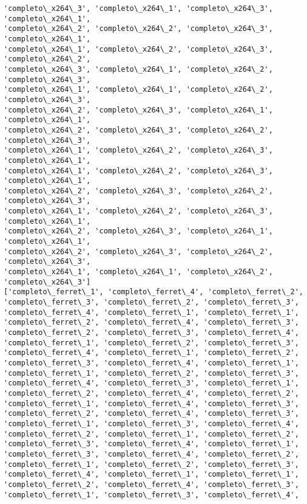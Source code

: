 \documentclass[11pt]{article}
\begin{document}
\begin{Verbatim}[commandchars=\\\{\}]
'completo\_x264\_3', 'completo\_x264\_1', 'completo\_x264\_3', 'completo\_x264\_1',
'completo\_x264\_2', 'completo\_x264\_2', 'completo\_x264\_3', 'completo\_x264\_1',
'completo\_x264\_1', 'completo\_x264\_2', 'completo\_x264\_3', 'completo\_x264\_2',
'completo\_x264\_3', 'completo\_x264\_1', 'completo\_x264\_2', 'completo\_x264\_3',
'completo\_x264\_1', 'completo\_x264\_1', 'completo\_x264\_2', 'completo\_x264\_3',
'completo\_x264\_2', 'completo\_x264\_3', 'completo\_x264\_1', 'completo\_x264\_1',
'completo\_x264\_2', 'completo\_x264\_3', 'completo\_x264\_2', 'completo\_x264\_3',
'completo\_x264\_1', 'completo\_x264\_2', 'completo\_x264\_3', 'completo\_x264\_1',
'completo\_x264\_1', 'completo\_x264\_2', 'completo\_x264\_3', 'completo\_x264\_1',
'completo\_x264\_2', 'completo\_x264\_3', 'completo\_x264\_2', 'completo\_x264\_3',
'completo\_x264\_1', 'completo\_x264\_2', 'completo\_x264\_3', 'completo\_x264\_1',
'completo\_x264\_2', 'completo\_x264\_3', 'completo\_x264\_1', 'completo\_x264\_1',
'completo\_x264\_2', 'completo\_x264\_3', 'completo\_x264\_2', 'completo\_x264\_3',
'completo\_x264\_1', 'completo\_x264\_1', 'completo\_x264\_2', 'completo\_x264\_3']
['completo\_ferret\_1', 'completo\_ferret\_4', 'completo\_ferret\_2',
'completo\_ferret\_3', 'completo\_ferret\_2', 'completo\_ferret\_3',
'completo\_ferret\_4', 'completo\_ferret\_1', 'completo\_ferret\_1',
'completo\_ferret\_2', 'completo\_ferret\_4', 'completo\_ferret\_3',
'completo\_ferret\_2', 'completo\_ferret\_3', 'completo\_ferret\_4',
'completo\_ferret\_1', 'completo\_ferret\_2', 'completo\_ferret\_3',
'completo\_ferret\_4', 'completo\_ferret\_1', 'completo\_ferret\_2',
'completo\_ferret\_3', 'completo\_ferret\_4', 'completo\_ferret\_1',
'completo\_ferret\_1', 'completo\_ferret\_2', 'completo\_ferret\_3',
'completo\_ferret\_4', 'completo\_ferret\_3', 'completo\_ferret\_1',
'completo\_ferret\_2', 'completo\_ferret\_4', 'completo\_ferret\_2',
'completo\_ferret\_1', 'completo\_ferret\_4', 'completo\_ferret\_3',
'completo\_ferret\_2', 'completo\_ferret\_4', 'completo\_ferret\_3',
'completo\_ferret\_1', 'completo\_ferret\_3', 'completo\_ferret\_4',
'completo\_ferret\_2', 'completo\_ferret\_1', 'completo\_ferret\_2',
'completo\_ferret\_3', 'completo\_ferret\_4', 'completo\_ferret\_1',
'completo\_ferret\_3', 'completo\_ferret\_4', 'completo\_ferret\_2',
'completo\_ferret\_1', 'completo\_ferret\_2', 'completo\_ferret\_3',
'completo\_ferret\_4', 'completo\_ferret\_1', 'completo\_ferret\_1',
'completo\_ferret\_2', 'completo\_ferret\_4', 'completo\_ferret\_3',
'completo\_ferret\_1', 'completo\_ferret\_3', 'completo\_ferret\_4',

\end{Verbatim}
\end{document}
